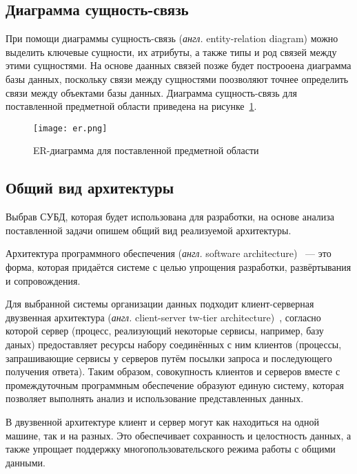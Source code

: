 \subsection{Диаграмма сущность-связь}

При помощи диаграммы сущность-связь (\textit{англ.} entity-relation diagram) можно выделить ключевые сущности, их атрибуты, а также типы и род связей между этими сущностями.
На основе даанных связей позже будет построоена диаграмма базы данных, поскольку связи между сущностями поозволяют точнее определить связи между объектами базы данных.
Диаграмма сущность-связь для поставленной предметной области приведена на рисунке~\ref{fig:er}.

\begin{figure}[h!]
	\centering
	\captionsetup{justification=centering}
	\texttt{[image: er.png]}
	\caption{ER-диаграмма для поставленной предметной области}
	\label{fig:er}
\end{figure}


\subsection{Общий вид архитектуры}

Выбрав СУБД, которая будет использована для разработки, на основе анализа поставленной задачи опишем общий вид реализуемой архитектуры.

Архитектура программного обеспечения (\textit{англ.} software architecture)~\cite{clean-architecture} --- это форма, которая придаётся системе с целью упрощения разработки, развёртывания и сопровождения. 

Для выбранной системы организации данных подходит клиент-серверная двузвенная архитектура (\textit{англ.} client-server tw-tier architecture)~\cite{client-server}, согласно которой сервер (процесс, реализующий некоторые сервисы, например, базу даных) предоставляет ресурсы набору соединённых с ним клиентов (процессы, запрашивающие сервисы у серверов путём посылки запроса и последующего получения ответа).
Таким образом, совокупность клиентов и серверов вместе с промеждуточным программным обеспечение образуют единую систему, которая позволяет выполнять анализ и использование представленных данных.

В двузвенной архитектуре клиент и сервер могут как находиться на одной машине, так и на разных. 
Это обеспечивает сохранность и целостность данных, а также  упрощает поддержку многопользовательского режима работы с общими данными.

